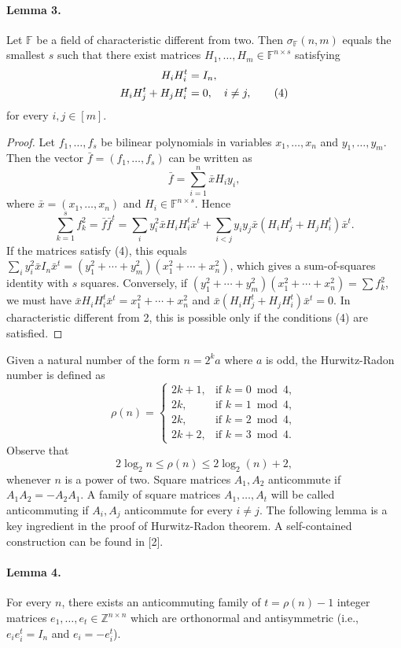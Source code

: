 \paragraph{Lemma 3.} Let $\mathbb F$ be a field of characteristic different from two. Then $\sigma_{\mathbb F}(n,m)$ equals the smallest $s$ such that there exist matrices $H_1,\ldots,H_m\in\mathbb F^{n\times s}$ satisfying
\begin{align}
H_iH_i^t&=I_n,\notag\\
H_iH_j^t+H_jH_i^t&=0,\quad i\ne j,\tag{4}
\end{align}
for every $i,j\in[m]$.
\begin{proof}
Let $f_1,\ldots,f_s$ be bilinear polynomials in variables $x_1,\ldots,x_n$ and $y_1,\ldots,y_m$. Then the vector $\bar f=(f_1,\ldots,f_s)$ can be written as
\[\bar f=\sum_{i=1}^n\bar xH_i y_i,\]
where $\bar x=(x_1,\ldots,x_n)$ and $H_i\in\mathbb F^{n\times s}$. Hence
\[\sum_{k=1}^s f_k^2=\bar f\bar f^t=\sum_i y_i^2\bar xH_iH_i^t\bar x^t+\sum_{i<j}y_i y_j\bar x(H_iH_j^t+H_jH_i^t)\bar x^t.\]
If the matrices satisfy (4), this equals $\sum_i y_i^2\bar xI_n\bar x^t=(y_1^2+\cdots+y_m^2)(x_1^2+\cdots+x_n^2)$, which gives a sum-of-squares identity with $s$ squares. Conversely, if $(y_1^2+\cdots+y_m^2)(x_1^2+\cdots+x_n^2)=\sum f_k^2$, we must have $\bar xH_iH_i^t\bar x^t=x_1^2+\cdots+x_n^2$ and $\bar x(H_iH_j^t+H_jH_i^t)\bar x^t=0$. In characteristic different from 2, this is possible only if the conditions (4) are satisfied.
\end{proof}
Given a natural number of the form $n=2^k a$ where $a$ is odd, the Hurwitz-Radon number is defined as
\[\rho(n)=\begin{cases}2k+1,&\text{if }k=0\bmod4,\\2k,&\text{if }k=1\bmod4,\\2k,&\text{if }k=2\bmod4,\\2k+2,&\text{if }k=3\bmod4.\end{cases}\]
Observe that
\[2\log_2n\le\rho(n)\le2\log_2(n)+2,\]
whenever $n$ is a power of two.
Square matrices $A_1,A_2$ anticommute if $A_1A_2=-A_2A_1$. A family of square matrices $A_1,\ldots,A_t$ will be called anticommuting if $A_i,A_j$ anticommute for every $i\ne j$.
The following lemma is a key ingredient in the proof of Hurwitz-Radon theorem. A self-contained construction can be found in [2].
\paragraph{Lemma 4.} For every $n$, there exists an anticommuting family of $t=\rho(n)-1$ integer matrices $e_1,\ldots,e_t\in\mathbb Z^{n\times n}$ which are orthonormal and antisymmetric (i.e., $e_ie_i^t=I_n$ and $e_i=-e_i^t$).
